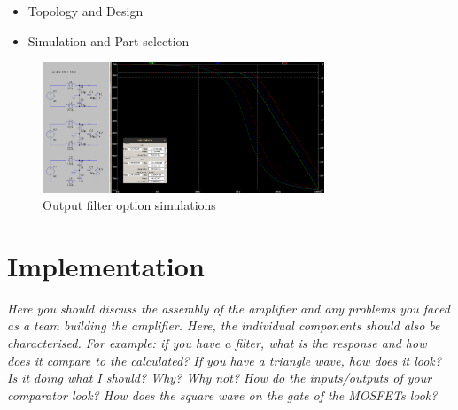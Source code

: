 \documentclass[11pt]{article}
\begin{document}
{\begin{itemize}
  \item Topology and Design
  \item Simulation and Part selection
\end{itemize}







\begin{figure}[h!]
  \centering
  \includegraphics[width=0.75\textwidth]{img/output_filter_sim.png}
  \caption{Output filter option simulations}
  \label{F:opf_sim}
\end{figure}



\newpage
\section{Implementation}

\textit{Here you should discuss the assembly of the amplifier and any problems you faced as a team building the amplifier.
Here, the individual components should also be characterised. For example: if you have a filter, what is the response and how does it compare to the calculated? If you have a triangle wave, how does it look? Is it doing what I should? Why? Why not? How do the inputs/outputs of your comparator look? How does the square wave on the gate of the MOSFETs look?}
 

}
\end{document}
